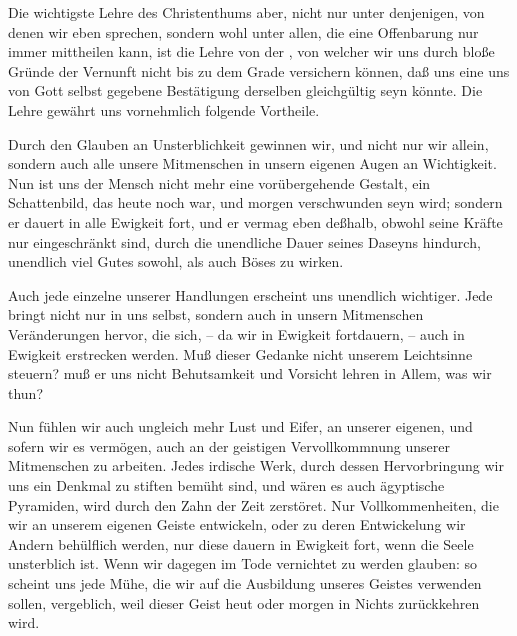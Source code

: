 \begin{aufza}
\item Die wichtigste Lehre des Christenthums aber, nicht nur unter denjenigen, von denen wir eben sprechen, sondern wohl unter allen, die eine Offenbarung nur immer mittheilen kann, ist die Lehre von der , von welcher wir uns durch bloße Gründe der Vernunft nicht bis zu dem Grade versichern können, daß uns eine uns von Gott selbst gegebene Bestätigung derselben gleichgültig seyn könnte. Die Lehre gewährt uns vornehmlich folgende Vortheile.
\begin{aufzb}
\item Durch den Glauben an Unsterblichkeit gewinnen wir, und nicht nur wir allein, sondern auch alle unsere Mitmenschen in unsern eigenen Augen an Wichtigkeit. Nun ist uns der Mensch nicht mehr eine vorübergehende Gestalt, ein Schattenbild, das heute noch war, und morgen verschwunden seyn wird; sondern er dauert in alle Ewigkeit fort, und er vermag eben deßhalb, obwohl seine Kräfte nur eingeschränkt sind, durch die unendliche Dauer seines Daseyns hindurch, unendlich viel Gutes sowohl, als auch Böses zu wirken.
\item Auch jede einzelne unserer Handlungen erscheint uns unendlich wichtiger. Jede bringt nicht nur in uns selbst, sondern auch in unsern Mitmenschen Veränderungen hervor, die sich, -- da wir in Ewigkeit fortdauern, -- auch in Ewigkeit erstrecken werden. Muß dieser Gedanke nicht unserem Leichtsinne steuern? muß er uns nicht Behutsamkeit und Vorsicht lehren in Allem, was wir thun?
\item Nun fühlen wir auch ungleich mehr Lust und Eifer, an unserer eigenen, und sofern wir es vermögen, auch an der geistigen Vervollkommnung unserer Mitmenschen zu arbeiten. Jedes irdische Werk, durch dessen Hervorbringung wir uns ein Denkmal zu stiften bemüht sind, und wären es auch ägyptische Pyramiden, wird durch den Zahn der Zeit zerstöret. Nur Vollkommenheiten, die wir an unserem eigenen Geiste entwickeln, oder zu deren Entwickelung wir Andern behülflich werden, nur diese dauern in Ewigkeit fort, wenn die Seele unsterblich ist. Wenn wir dagegen im Tode vernichtet zu werden glauben: so scheint uns jede Mühe, die wir auf die Ausbildung unseres Geistes verwenden sollen, vergeblich, weil dieser Geist heut oder morgen in Nichts zurückkehren wird.

\end{aufzb}
\end{aufza}
